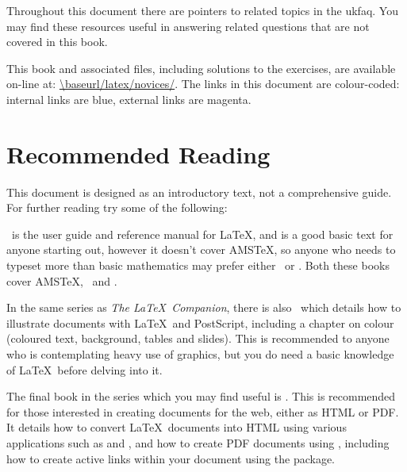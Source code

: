 Throughout this document there are pointers to related topics
in the \gls{ukfaq}.
%
 You may find these resources useful in
answering related questions that are not covered in this 
book.
\begin{latexonly}

This book and associated files, including  
solutions to the exercises, are available on-line at:
\url{\baseurl/latex/novices/}. 
\doifnotbook
{%
  The links in this document are colour-coded: internal links are 
  blue, external links are magenta.
}%
\end{latexonly}

\section{Recommended Reading}

This document is designed as an introductory text, not a
comprehensive guide.  For further reading try some of the
following:

\latexbook\ is the user guide and reference manual for \LaTeX, and
is a good basic text for anyone starting out, however it doesn't
cover AMS\TeX{}, so anyone who
needs to typeset more than basic mathematics may prefer either
\latexguide\ or \latexcomp.  Both these books cover AMS\TeX,
\iBiBTeX\ and .

In the same series as \emph{The \LaTeX\ Companion}, there is also 
\latexgraphic\ which details how to illustrate
documents with \LaTeX\ and PostScript, including a chapter on colour
(coloured text, background, tables and slides).  This is recommended
to anyone who is contemplating heavy use of graphics, but you do need
a basic knowledge of \LaTeX\ before delving into it.  

The final book in the  series which you may find useful
is \latexweb. This is recommended for those interested in creating
documents for the web, either as HTML or PDF.  It details how
to convert \LaTeX\ documents into HTML using various applications
such as  and , and how to create
PDF documents using \iPDFLaTeX{},
including how to create active links within your document using the
 package.

